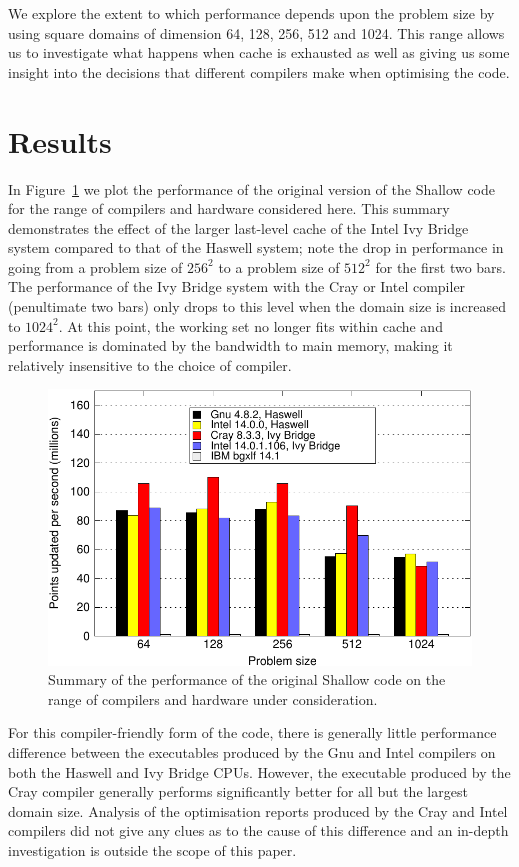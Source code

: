 \documentclass{IOS-Book-Article}
\begin{document}
We explore the extent to which performance depends upon the problem
size by using square domains of dimension 64, 128, 256, 512 and
1024. This range allows us to investigate what happens when cache is
exhausted as well as giving us some insight into the decisions that
different compilers make when optimising the code.

\section{Results}

In Figure~\ref{FIG_orig_perf_summary} we plot the performance of the
original version of the Shallow code for the range of compilers and
hardware considered here. This summary demonstrates the effect of the
larger last-level cache of the Intel Ivy Bridge system compared to
that of the Haswell system; note the drop in performance
in going from a problem size of $256^{2}$ to a problem size of
$512^{2}$ for the first two bars. The performance of the Ivy
Bridge system with the Cray or Intel compiler (penultimate two bars)
only drops to this level when the domain size is increased to
$1024^{2}$. At this point, the working set no longer fits within cache
and performance is dominated by the bandwidth to main memory, making
it relatively insensitive to the choice of compiler.

\begin{figure}[!t]
\centering
\includegraphics[width=120mm]{orig_summary}
\caption{Summary of the performance of the original Shallow code on
  the range of compilers and hardware under consideration.}
\label{FIG_orig_perf_summary}
\end{figure}

For this compiler-friendly form of the code, there is generally little
performance difference between the executables produced by the Gnu and
Intel compilers on both the Haswell and Ivy Bridge CPUs. However, the
executable produced by the Cray compiler generally performs
significantly better for all but the largest domain size. Analysis of
the optimisation reports produced by the Cray and Intel compilers did
not give any clues as to the cause of this difference and an in-depth
investigation is outside the scope of this paper.
\end{document}

